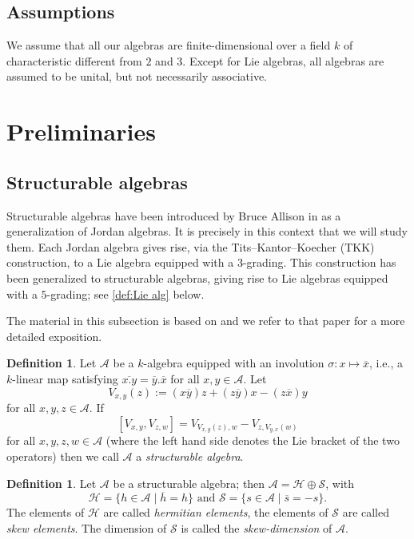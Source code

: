\documentclass[oneside,a4paper]{amsart} %
\theoremstyle{definition}
\newtheorem{definition}[theorem]{Definition}
\newcommand{\A}{\mathcal{A}}
\renewcommand{\SS}{\mathcal{S}}
\numberwithin{equation}{section}
\begin{document}
\subsection{Assumptions}

We assume that all our algebras are finite-dimensional over a field $k$ of characteristic different from $2$ and $3$.
Except for Lie algebras, all algebras are assumed to be unital, but not necessarily associative.


\section{Preliminaries}
\label{sec 2}

\subsection{Structurable algebras}

Structurable algebras have been introduced by Bruce Allison in \cite{Allison1978} as a generalization of Jordan algebras. It is precisely in this context that we will study them. Each Jordan algebra gives rise, via the Tits--Kantor--Koecher (TKK) construction, to a Lie algebra equipped with a $3$-grading. This construction has been generalized to structurable algebras, giving rise to Lie algebras equipped with a $5$-grading; see \cref{def:Lie alg} below.

The material in this subsection is based on \cite[Chapter 2]{Boelaert2019} and we refer to that paper for a more detailed exposition.

\begin{definition}\label{def:struct algebra}
	Let $\A$ be a $k$-algebra equipped with an involution $\sigma \colon x \mapsto \overline{x}$, i.e., a $k$-linear map satisfying $\overline{x.y}=\overline{y} .\overline{x}$ for all $x,y \in \A$.
	Let
	\[ V_{x,y}(z):=(x\overline y)z+(z\overline y)x-(z\overline x)y \]
	for all $x,y,z \in \A$.
	If
		\[ [V_{x,y},V_{z,w}]=V_{V_{x,y}(z),w}-V_{z,V_{y,x}(w)} \]
	for all $x,y,z,w\in\A$ (where the left hand side denotes the Lie bracket of the two operators)
	then we call $\A$ a \textit{structurable algebra}.
\end{definition}

\begin{definition}

	Let $\A$ be a structurable algebra; then $\A=\mathcal H\oplus \SS$, with 
		\[ \mathcal H=\{h\in\A\mid\overline h=h\} \text{ and } \SS=\{s\in\A\mid \overline s=-s\}.\]
	The elements of $\mathcal H$ are called \textit{hermitian elements}, the elements of $\SS$ are called \textit{skew elements}. 
	The dimension of $\SS$ is called the \textit{skew-dimension} of $\A$.
	
\end{definition}
\end{document}
